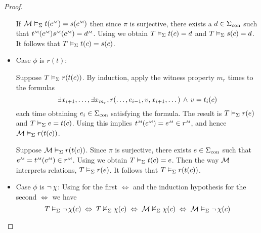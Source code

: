 \begin{proof}
\begin{itemize}
            \begin{backward}
                If $\MM \modelsi t(\mmintp{c}) = s(\mmintp{c})$ 
                then since $\pi$ is surjective,
                there exists a $d \in {\Sigma}_\mathrm{con}$ such that 
                $\mmintp{t}(\mmintp{c}) \mmintp{s}(\mmintp{c})= \mmintp{d}$.
                Using  
                we obtain $T \vDash_{\Sigma} t(c) = d$ and 
                $T \vDash_{\Sigma} s(c) = d$.
                It follows that $T \vDash_{\Sigma} t(c) = s(c)$.
            \end{backward}

        \item Case $\phi$ is $r(t)$:
            \begin{forward}
                Suppose $T \vDash_{\Sigma} r(t(c))$.
                By induction, 
                apply the witness property 
                $m_r$ times to the formulas
                \[\exists x_{i + 1}, \dots, 
                \exists x_{m_r}, r(
                    \dots, e_{i-1}, v , x_{i+1},\dots
                    ) \, \land \, v = t_i(c)\]
                each time obtaining $e_i \in {\Sigma}_\mathrm{con}$ satisfying the formula.
                The result is $T \vDash_{\Sigma} r(e)$ and 
                $T \vDash_{\Sigma} e = t(c)$.
                Using  
                this implies
                $\mmintp{t}(\mmintp{c}) 
                = \mmintp{e} \in \mmintp{r}$,
                and hence $\mathcal{M} \vDash_{\Sigma} r(t(c))$.
            \end{forward}
            \begin{backward}
                Suppose $\mathcal{M} \vDash_{\Sigma} r(t(c))$.
                Since $\pi$ is surjective, 
                there exists $e \in {\Sigma}_\mathrm{con}$ 
                such that $\mmintp{e} = \mmintp{t}(\mmintp{c}) \in \mmintp{r}$.
                Using  
                we obtain $T \vDash_{\Sigma} t(c) = e$.
                Then the way $\mathcal{M}$ interprets relations,
                $T \vDash_{\Sigma} r(e)$.
                It follows that $T \vDash_{\Sigma} r(t(c))$.
            \end{backward}
        
        \item Case $\phi$ is $\neg\, \chi$:
            Using  
            for the first $\iff$
            and the induction hypothesis for the second $\iff$ we have
            \[T \vDash_{\Sigma} \neg\, \chi(c) \; \Leftrightarrow \;  
            T \nvDash_{\Sigma} \chi(c) \; \Leftrightarrow \; \mathcal{M} \nvDash_{\Sigma} \chi(c) \; \Leftrightarrow \;
            \mathcal{M} \vDash_{\Sigma} \neg\, \chi(c)\]


\end{itemize}
\end{proof}
